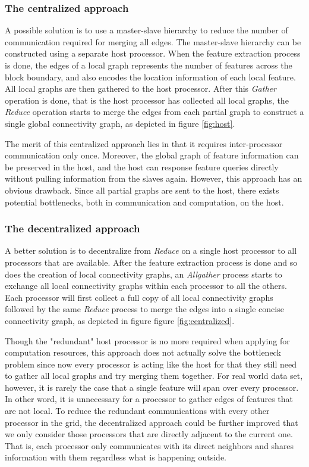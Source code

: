 \documentclass[10pt, conference, compsocconf]{IEEEtran}
\begin{document}
\subsubsection{The centralized approach}

A possible solution is to use a master-slave hierarchy to reduce the number of communication required for merging all edges. The master-slave hierarchy can be constructed using a separate host processor. When the feature extraction process is done, the edges of a local graph represents the number of features across the block boundary, and also encodes the location information of each local feature. All local graphs are then gathered to the host processor. After this \emph{Gather} operation is done, that is the host processor has collected all local graphs, the \emph{Reduce} operation starts to merge the edges from each partial graph to construct a single global connectivity graph, as depicted in figure \ref{fig:host}.

The merit of this centralized approach lies in that it requires inter-processor communication only once. Moreover, the global graph of feature information can be preserved in the host, and the host can response feature queries directly without pulling information from the slaves again. However, this approach has an obvious drawback. Since all partial graphs are sent to the host, there exists potential bottlenecks, both in communication and computation, on the host.  

\subsubsection{The decentralized approach}

A better solution is to decentralize from \emph{Reduce} on a single host processor to all processors that are available. After the feature extraction process is done and so does the creation of local connectivity graphs, an \emph{Allgather} process starts to exchange all local connectivity graphs within each processor to all the others. Each processor will first collect a full copy of all local connectivity graphs followed by the same \emph{Reduce} process to merge the edges into a single concise connectivity graph, as depicted in figure figure \ref{fig:centralized}.

Though the "redundant" host processor is no more required when applying for computation resources, this approach does not actually solve the bottleneck problem since now every processor is acting like the host for that they still need to gather all local graphs and try merging them together. For real world data set, however, it is rarely the case that a single feature will span over every processor. In other word, it is unnecessary for a processor to gather edges of features that are not local. To reduce the redundant communications with every other processor in the grid, the decentralized approach could be further improved that we only consider those processors that are directly adjacent to the current one. That is, each processor only communicates with its direct neighbors and shares information with them regardless what is happening outside.
\end{document}
